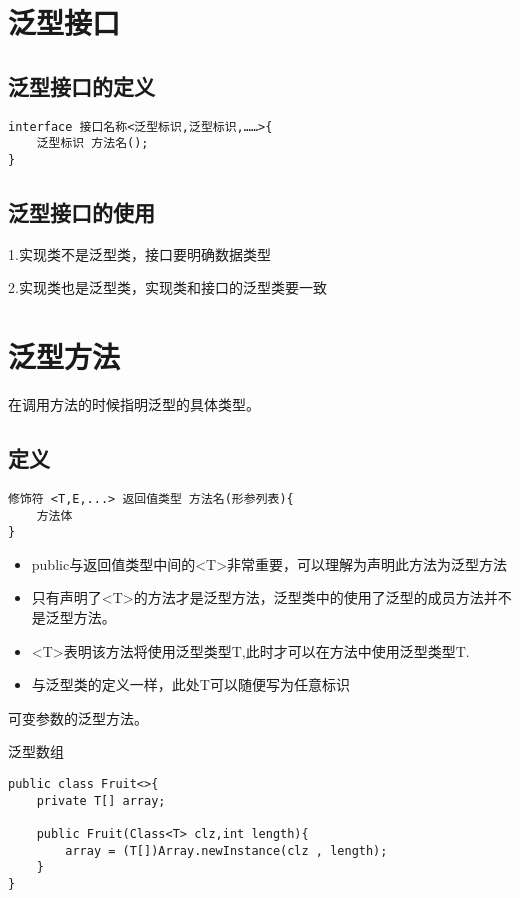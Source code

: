 \documentclass[a4paper]{report}
\begin{document}
\section{泛型接口}
\subsection{泛型接口的定义}
\begin{lstlisting}
interface 接口名称<泛型标识,泛型标识,……>{
    泛型标识 方法名();
}
\end{lstlisting}

\subsection{泛型接口的使用}
1.实现类不是泛型类，接口要明确数据类型

2.实现类也是泛型类，实现类和接口的泛型类要一致
\section{泛型方法}
在调用方法的时候指明泛型的具体类型。
\subsection{定义}
\begin{lstlisting}
修饰符 <T,E,...> 返回值类型 方法名(形参列表){
    方法体
}
\end{lstlisting}
\begin{itemize}
  \item public与返回值类型中间的<T>非常重要，可以理解为声明此方法为泛型方法
  \item 只有声明了<T>的方法才是泛型方法，泛型类中的使用了泛型的成员方法并不是泛型方法。
  \item <T>表明该方法将使用泛型类型T,此时才可以在方法中使用泛型类型T.
  \item 与泛型类的定义一样，此处T可以随便写为任意标识
\end{itemize}

可变参数的泛型方法。


泛型数组
\begin{lstlisting}
public class Fruit<>{
    private T[] array;
    
    public Fruit(Class<T> clz,int length){
        array = (T[])Array.newInstance(clz , length);
    }
}
\end{lstlisting}
\end{document}
